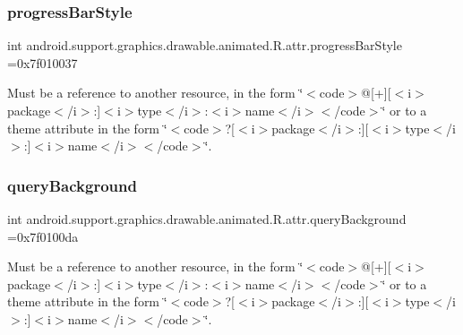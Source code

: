 \subsubsection{\texorpdfstring{progress\+Bar\+Style}{progressBarStyle}}
{\footnotesize\ttfamily int android.\+support.\+graphics.\+drawable.\+animated.\+R.\+attr.\+progress\+Bar\+Style =0x7f010037\hspace{0.3cm}{\ttfamily [static]}}

Must be a reference to another resource, in the form \char`\"{}$<$code$>$@\mbox{[}+\mbox{]}\mbox{[}$<$i$>$package$<$/i$>$\+:\mbox{]}$<$i$>$type$<$/i$>$\+:$<$i$>$name$<$/i$>$$<$/code$>$\char`\"{} or to a theme attribute in the form \char`\"{}$<$code$>$?\mbox{[}$<$i$>$package$<$/i$>$\+:\mbox{]}\mbox{[}$<$i$>$type$<$/i$>$\+:\mbox{]}$<$i$>$name$<$/i$>$$<$/code$>$\char`\"{}. \mbox{\label{classandroid_1_1support_1_1graphics_1_1drawable_1_1animated_1_1R_1_1attr_a0306023b5d4883dacd62d9a41e38c608}} 
\subsubsection{\texorpdfstring{query\+Background}{queryBackground}}
{\footnotesize\ttfamily int android.\+support.\+graphics.\+drawable.\+animated.\+R.\+attr.\+query\+Background =0x7f0100da\hspace{0.3cm}{\ttfamily [static]}}

Must be a reference to another resource, in the form \char`\"{}$<$code$>$@\mbox{[}+\mbox{]}\mbox{[}$<$i$>$package$<$/i$>$\+:\mbox{]}$<$i$>$type$<$/i$>$\+:$<$i$>$name$<$/i$>$$<$/code$>$\char`\"{} or to a theme attribute in the form \char`\"{}$<$code$>$?\mbox{[}$<$i$>$package$<$/i$>$\+:\mbox{]}\mbox{[}$<$i$>$type$<$/i$>$\+:\mbox{]}$<$i$>$name$<$/i$>$$<$/code$>$\char`\"{}. \mbox{\label{classandroid_1_1support_1_1graphics_1_1drawable_1_1animated_1_1R_1_1attr_a4720a94b3f352aacb47badc751047441}} 
